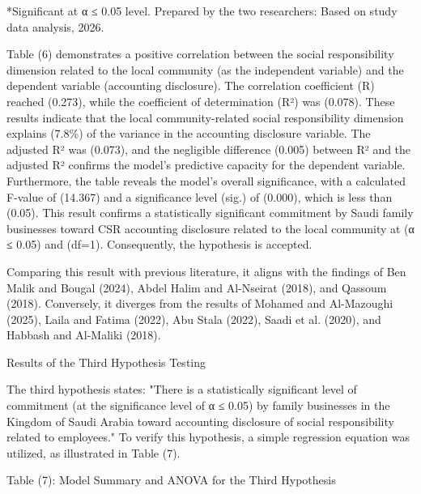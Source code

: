 \documentclass[10pt]{NSP1}
\begin{document}
*Significant at α ≤ 0.05 level. Prepared by the two researchers: Based on study data analysis, 2026.

Table (6) demonstrates a positive correlation between the social responsibility dimension related to the local community (as the independent variable) and the dependent variable (accounting disclosure). The correlation coefficient (R) reached (0.273), while the coefficient of determination (R²) was (0.078). These results indicate that the local community-related social responsibility dimension explains (7.8\%) of the variance in the accounting disclosure variable. The adjusted R² was (0.073), and the negligible difference (0.005) between R² and the adjusted R² confirms the model’s predictive capacity for the dependent variable. Furthermore, the table reveals the model's overall significance, with a calculated F-value of (14.367) and a significance level (sig.) of (0.000), which is less than (0.05). This result confirms a statistically significant commitment by Saudi family businesses toward CSR accounting disclosure related to the local community at (α ≤ 0.05) and (df=1). Consequently, the hypothesis is accepted.

Comparing this result with previous literature, it aligns with the findings of Ben Malik and Bougal (2024), Abdel Halim and Al-Nseirat (2018), and Qassoum (2018). Conversely, it diverges from the results of Mohamed and Al-Mazoughi (2025), Laila and Fatima (2022), Abu Stala (2022), Saadi et al. (2020), and Habbash and Al-Maliki (2018).

Results of the Third Hypothesis Testing

The third hypothesis states: "There is a statistically significant level of commitment (at the significance level of α ≤ 0.05) by family businesses in the Kingdom of Saudi Arabia toward accounting disclosure of social responsibility related to employees." To verify this hypothesis, a simple regression equation was utilized, as illustrated in Table (7).

Table (7): Model Summary and ANOVA for the Third Hypothesis

\begin{table}[htbp]
\centering
{}
\caption{}

\end{table}
\end{document}
